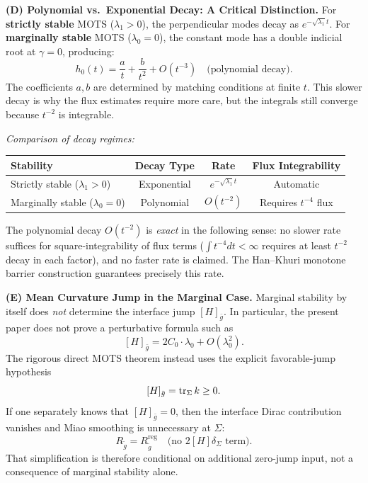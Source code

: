 \begin{remark}
\textbf{(D) Polynomial vs.\ Exponential Decay: A Critical Distinction.}
For \textbf{strictly stable} MOTS ($\lambda_1 > 0$), the perpendicular modes decay as $e^{-\sqrt{\lambda_1} t}$. For \textbf{marginally stable} MOTS ($\lambda_0 = 0$), the constant mode has a double indicial root at $\gamma = 0$, producing:
\begin{equation}
    h_0(t) = \frac{a}{t} + \frac{b}{t^2} + O(t^{-3}) \quad \text{(polynomial decay)}.
\end{equation}
The coefficients $a, b$ are determined by matching conditions at finite $t$. This slower decay is why the flux estimates require more care, but the integrals still converge because $t^{-2}$ is integrable.

\medskip
\noindent\textit{Comparison of decay regimes:}
\begin{center}
\renewcommand{\arraystretch}{1.3}
\begin{tabular}{|l|c|c|c|}
\hline
\textbf{Stability} & \textbf{Decay Type} & \textbf{Rate} & \textbf{Flux Integrability} \\
\hline
Strictly stable ($\lambda_1 > 0$) & Exponential & $e^{-\sqrt{\lambda_1} t}$ & Automatic \\
Marginally stable ($\lambda_0 = 0$) & Polynomial & $O(t^{-2})$ & Requires $t^{-4}$ flux \\
\hline
\end{tabular}
\end{center}

\noindent The polynomial decay $O(t^{-2})$ is \emph{exact} in the following sense: no slower rate suffices for square-integrability of flux terms ($\int t^{-4} dt < \infty$ requires at least $t^{-2}$ decay in each factor), and no faster rate is claimed. The Han--Khuri monotone barrier construction guarantees precisely this rate.

\textbf{(E) Mean Curvature Jump in the Marginal Case.}
Marginal stability by itself does \emph{not} determine the interface jump $[H]_{\bar{g}}$. In particular, the present paper does not prove a perturbative formula such as
\[
    [H]_{\bar{g}} = 2C_0 \cdot \lambda_0 + O(\lambda_0^2).
\]
The rigorous direct MOTS theorem instead uses the explicit favorable-jump hypothesis
\[
    [H]_{\bar{g}} = \operatorname{tr}_\Sigma k \ge 0.
\]
If one separately knows that $[H]_{\bar{g}} = 0$, then the interface Dirac contribution vanishes and Miao smoothing is unnecessary at $\Sigma$:
\begin{equation}
    R_{\tilde{g}} = R_{\tilde{g}}^{\mathrm{reg}} \quad \text{(no } 2[H]\delta_\Sigma \text{ term)}.
\end{equation}
That simplification is therefore conditional on additional zero-jump input, not a consequence of marginal stability alone.


\end{remark}
